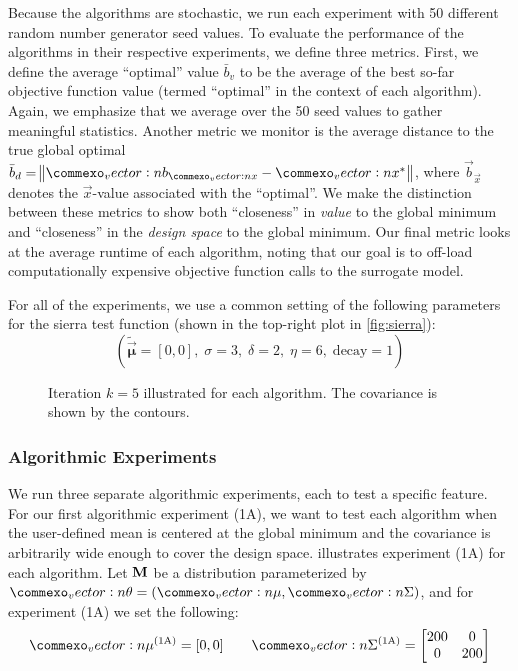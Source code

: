 Because the algorithms are stochastic, we run each experiment with 50 different random number generator seed values.
To evaluate the performance of the algorithms in their respective experiments, we define three metrics.
First, we define the average ``optimal'' value $\bar{b}_v$ to be the average of the best so-far objective function value (termed ``optimal'' in the context of each algorithm). Again, we emphasize that we average over the 50 seed values to gather meaningful statistics.
Another metric we monitor is the average distance to the true global optimal $\bar{b}_d = \norm{\vec{b}_{\vec{x}} - \vec{x}^*}$, where $\vec{b}_{\vec{x}}$ denotes the $\vec{x}$-value associated with the ``optimal''.
We make the distinction between these metrics to show both ``closeness'' in \textit{value} to the global minimum and ``closeness'' in the \textit{design space} to the global minimum.
Our final metric looks at the average runtime of each algorithm, noting that our goal is to off-load computationally expensive objective function calls to the surrogate model.

For all of the experiments, we use a common setting of the following parameters for the sierra test function (shown in the top-right plot in \cref{fig:sierra}):
\begin{equation*}
    (\mathbf{\widetilde{\vec{\mu}}} =[0,0],\; \sigma=3,\; \delta=2,\; \eta=6,\; \text{decay} = 1)
\end{equation*}

\begin{figure*}[!b]
  \centering
  \caption{
    \label{fig:k5} Iteration $k=5$ illustrated for each algorithm. The covariance is shown by the contours.
  } 
\end{figure*}


\subsubsection{Algorithmic Experiments} \label{sec:cem_alg_experiments}
We run three separate algorithmic experiments, each to test a specific feature.
For our first algorithmic experiment (1A), we want to test each algorithm when the user-defined mean is centered at the global minimum and the covariance is arbitrarily wide enough to cover the design space.
 illustrates experiment (1A) for each algorithm.
Let $\mathbf{M}$ be a distribution parameterized by $\vec{\theta} = (\vec{\mu}, \mat{\Sigma})$, and for experiment (1A) we set the following:
\begin{equation*}
    \vec\mu^{(\text{1A})} = [0, 0] \qquad
    \mat\Sigma^{(\text{1A})} = \begin{bmatrix}
        200 & 0\\
        0 & 200
    \end{bmatrix}
\end{equation*}

